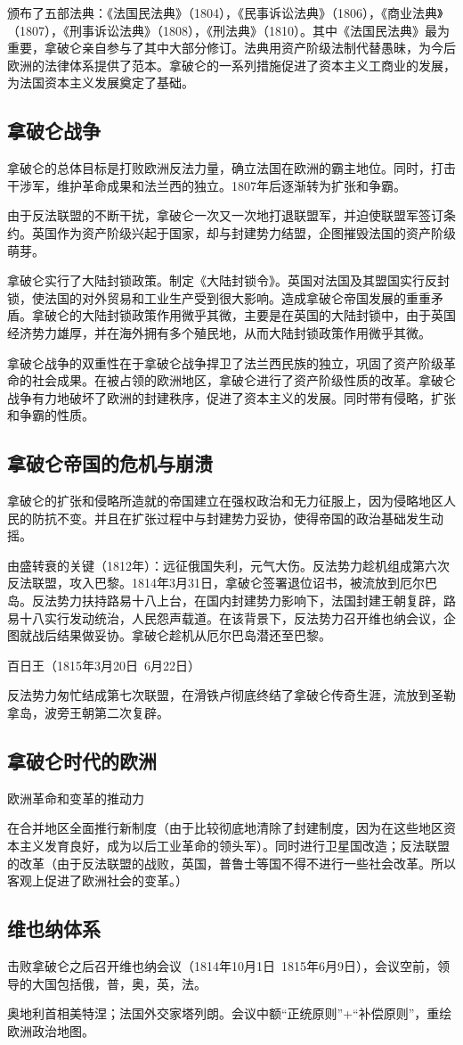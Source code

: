颁布了五部法典：《法国民法典》（1804），《民事诉讼法典》（1806），《商业法典》（1807），《刑事诉讼法典》（1808），《刑法典》（1810）。其中《法国民法典》最为重要，拿破仑亲自参与了其中大部分修订。法典用资产阶级法制代替愚昧，为今后欧洲的法律体系提供了范本。拿破仑的一系列措施促进了资本主义工商业的发展，为法国资本主义发展奠定了基础。

\subsection{拿破仑战争}
拿破仑的总体目标是打败欧洲反法力量，确立法国在欧洲的霸主地位。同时，打击干涉军，维护革命成果和法兰西的独立。1807年后逐渐转为扩张和争霸。

由于反法联盟的不断干扰，拿破仑一次又一次地打退联盟军，并迫使联盟军签订条约。英国作为资产阶级兴起于国家，却与封建势力结盟，企图摧毁法国的资产阶级萌芽。

拿破仑实行了大陆封锁政策。制定《大陆封锁令》。英国对法国及其盟国实行反封锁，使法国的对外贸易和工业生产受到很大影响。造成拿破仑帝国发展的重重矛盾。拿破仑的大陆封锁政策作用微乎其微，主要是在英国的大陆封锁中，由于英国经济势力雄厚，并在海外拥有多个殖民地，从而大陆封锁政策作用微乎其微。

拿破仑战争的双重性在于拿破仑战争捍卫了法兰西民族的独立，巩固了资产阶级革命的社会成果。在被占领的欧洲地区，拿破仑进行了资产阶级性质的改革。拿破仑战争有力地破坏了欧洲的封建秩序，促进了资本主义的发展。同时带有侵略，扩张和争霸的性质。

\subsection{拿破仑帝国的危机与崩溃}
拿破仑的扩张和侵略所造就的帝国建立在强权政治和无力征服上，因为侵略地区人民的防抗不变。并且在扩张过程中与封建势力妥协，使得帝国的政治基础发生动摇。

由盛转衰的关键（1812年）：远征俄国失利，元气大伤。反法势力趁机组成第六次反法联盟，攻入巴黎。1814年3月31日，拿破仑签署退位诏书，被流放到厄尔巴岛。反法势力扶持路易十八上台，在国内封建势力影响下，法国封建王朝复辟，路易十八实行发动统治，人民怨声载道。在该背景下，反法势力召开维也纳会议，企图就战后结果做妥协。拿破仑趁机从厄尔巴岛潜还至巴黎。

百日王（1815年3月20日~6月22日）

反法势力匆忙结成第七次联盟，在滑铁卢彻底终结了拿破仑传奇生涯，流放到圣勒拿岛，波旁王朝第二次复辟。

\subsection{拿破仑时代的欧洲}
欧洲革命和变革的推动力

在合并地区全面推行新制度（由于比较彻底地清除了封建制度，因为在这些地区资本主义发育良好，成为以后工业革命的领头军）。同时进行卫星国改造；反法联盟的改革（由于反法联盟的战败，英国，普鲁士等国不得不进行一些社会改革。所以客观上促进了欧洲社会的变革。）

\subsection{维也纳体系}
击败拿破仑之后召开维也纳会议（1814年10月1日~1815年6月9日），会议空前，领导的大国包括俄，普，奥，英，法。

奥地利首相美特涅；法国外交家塔列朗。会议中额“正统原则”+“补偿原则”，重绘欧洲政治地图。





